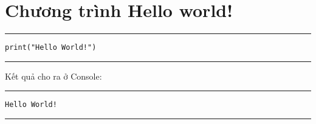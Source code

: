 \section{Chương trình Hello world!}
\rule{\linewidth}{0.2mm}\par
\begin{linenumbers}
	\texttt{print("Hello World!")}
\end{linenumbers}
\rule{\linewidth}{0.2mm}\par
\noindent
\resetlinenumber
Kết quả cho ra ở Console:\\
\rule{\linewidth}{0.2mm}\par
	\begin{linenumbers}
		\texttt{Hello World!}
	\end{linenumbers}
\rule{\linewidth}{0.2mm}
\resetlinenumber
\newpage